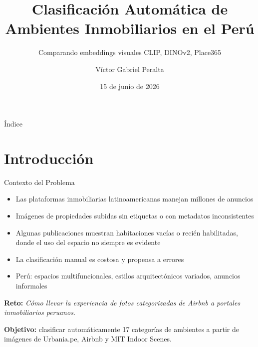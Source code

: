 \documentclass[aspectratio=169]{beamer}
\title{Clasificaci\'on Autom\'atica de Ambientes Inmobiliarios en el Per\'u}
\subtitle{Comparando embeddings visuales CLIP, DINOv2, Place365}
\author{V\'ictor Gabriel Peralta}
\institute{Facultad de Ingenier\'ia, Universidad de Buenos Aires (FIUBA)}
\date{15 de junio de 2026}
\begin{document}
\begin{frame}
\titlepage
\end{frame}

\begin{frame}{\'Indice}
\tableofcontents
\end{frame}

\section{Introducci\'on}

\begin{frame}{Contexto del Problema}
\begin{itemize}
\item Las plataformas inmobiliarias latinoamericanas manejan millones de anuncios
\item Im\'agenes de propiedades subidas sin etiquetas o con metadatos inconsistentes
\item Algunas publicaciones muestran habitaciones vac\'ias o reci\'en habilitadas, donde el uso del espacio no siempre es evidente
\item La clasificaci\'on manual es costosa y propensa a errores
\item Per\'u: espacios multifuncionales, estilos arquitect\'onicos variados, anuncios informales
\end{itemize}

\vspace{0.5cm}
\textbf{Reto:} \textit{C\'omo llevar la experiencia de fotos categorizadas de Airbnb a portales inmobiliarios peruanos.}

\vspace{0.25cm}
\textbf{Objetivo:} clasificar autom\'aticamente 17 categor\'ias de ambientes a partir de im\'agenes de Urbania.pe, Airbnb y MIT Indoor Scenes.
\end{frame}
\end{document}

